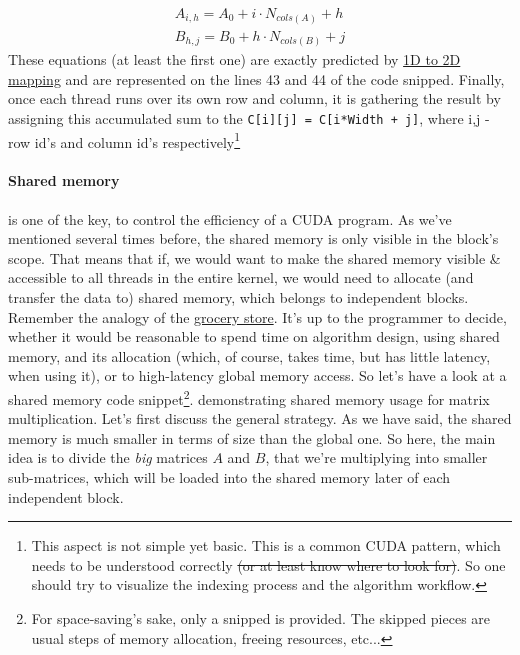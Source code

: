 \vspace{-0.9cm}
\begin{gather*}
 A_{i, h} = A_{0} + i\cdot N_{cols(A)} + h
\\
B_{h,j} = B_{0} + h \cdot N_{cols(B)} + j
\end{gather*}
These equations (at least the first one) are exactly predicted by \hyperref[intermezzo1d2d]{1D to 2D mapping} and
are represented on the lines 43 and 44 of the code snipped. 
Finally, once each thread runs over its own row and column, it is 
gathering the result by assigning this accumulated sum to the 
\verb|C[i][j] = C[i*Width + j]|, where i,j - row id's and column id's respectively\footnote{This 
aspect is not simple yet basic. This is a common CUDA pattern, which needs to be understood correctly 
\sout{(or at least know where to look for)}. So one should try to visualize the indexing process and the algorithm workflow. }


\paragraph*{Shared memory} is one of the key, to control the efficiency of a CUDA program. 
As we've mentioned several times before, the shared memory is only visible in the block's scope. That means that 
if, we would want to make the shared memory visible \& accessible to all threads in the entire kernel, we would 
need to allocate (and transfer the data to) shared memory, which belongs to independent blocks. 
Remember the analogy of the \hyperref[grocery_store]{grocery store}.
It's up to the programmer to decide, whether it would be reasonable to spend time on algorithm design, using shared memory, and its allocation
 (which, of course, takes time, but has little latency, when using it), or to high-latency global memory access.
So let's have a look at a shared memory code snippet\footnote{For space-saving's sake, only a snipped is provided. The skipped pieces are usual steps of 
memory allocation, freeing resources, etc...}.
demonstrating shared memory usage for matrix multiplication. 
Let's first discuss the general strategy. As we have said, the shared memory is much smaller in terms of size 
than the global one. So here, the main idea is to divide the \textit{big} matrices $A$ and $B$, that we're multiplying into smaller
sub-matrices, which will be loaded into the shared memory later of each independent block.

